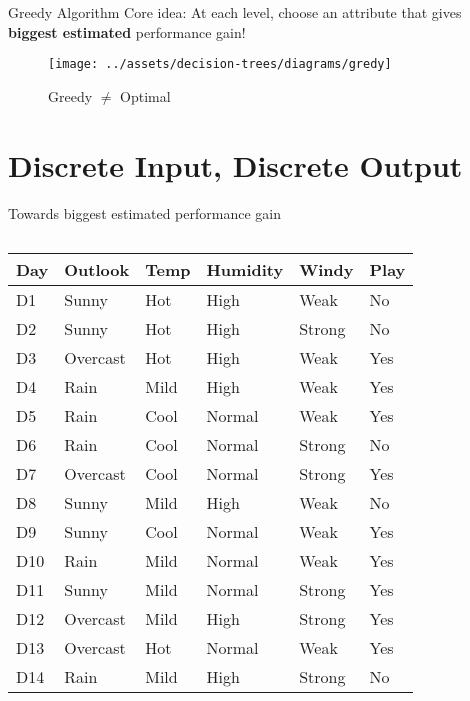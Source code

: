 \documentclass[usenames,dvipsnames]{beamer}
\begin{document}
\begin{frame}{Greedy Algorithm}
Core idea: At each level, choose an attribute that gives
\textbf{biggest estimated} performance gain!

\begin{figure}
	\centering
	\texttt{[image: ../assets/decision-trees/diagrams/gredy]}
	\caption{Greedy $\neq$ Optimal}
	\label{fig:gredy}
\end{figure}
\end{frame}


\section{Discrete Input, Discrete Output}

\begin{frame}{Towards biggest estimated performance gain}
\begin{columns}
\begin{column}{.7\textwidth}
\begin{scriptsize}
\begin{tabular}{lllll||l} \toprule
\textbf{Day} & \textbf{Outlook}  & \textbf{Temp} & \textbf{Humidity} & \textbf{Windy}  & \textbf{Play} \\ \midrule
D1  & Sunny    & Hot  & High     & Weak   & No   \\
D2  & Sunny    & Hot  & High     & Strong & No   \\
D3  & Overcast & Hot  & High     & Weak   & Yes  \\
D4  & Rain     & Mild & High     & Weak   & Yes  \\
D5  & Rain     & Cool & Normal   & Weak   & Yes  \\
D6  & Rain     & Cool & Normal   & Strong & No   \\
D7  & Overcast & Cool & Normal   & Strong & Yes  \\
D8  & Sunny    & Mild & High     & Weak   & No   \\
D9  & Sunny    & Cool & Normal   & Weak   & Yes  \\
D10 & Rain     & Mild & Normal   & Weak   & Yes  \\
D11 & Sunny    & Mild & Normal   & Strong & Yes  \\
D12 & Overcast & Mild & High     & Strong & Yes  \\
D13 & Overcast & Hot  & Normal   & Weak   & Yes  \\
D14 & Rain     & Mild & High     & Strong & No  \\ \bottomrule

\end{tabular}
\end{scriptsize}
\end{column}
\end{columns}
\end{frame}
\end{document}
